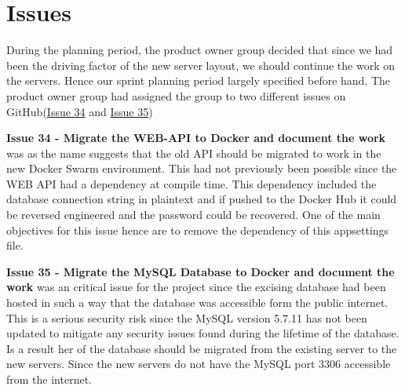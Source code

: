\section{Issues}
During the planning period, the product owner group decided that since we had been the driving factor of the new server layout, we should continue the work on the servers. 
Hence our sprint planning period largely specified before hand. 
The product owner group had assigned the group to two different issues on GitHub(\href{https://github.com/aau-giraf/wiki/issues/34}{Issue 34} and \href{https://github.com/aau-giraf/wiki/issues/35}{Issue 35})

\textbf{Issue 34 - Migrate the WEB-API to Docker and document the work} was as the name suggests that the old API should be migrated to work in the new Docker Swarm environment. 
This had not previously been possible since the WEB API had a dependency at compile time. 
This dependency included the database connection string in plaintext and if pushed to the Docker Hub it could be reversed engineered and the password could be recovered. 
One of the main objectives for this issue hence are to remove the dependency of this appsettings file. 

\textbf{Issue 35 - Migrate the MySQL Database to Docker and document the work} was an critical issue for the project since the excising database had been hosted in such a way that the database was accessible form the public internet. 
This is a serious security risk since the MySQL version 5.7.11 has not been updated to mitigate any security issues found during the lifetime of the database. 
Is a result her of the database should be migrated from the existing server to the new servers. 
Since the new servers do not have the MySQL port $3306$ accessible from the internet. 
